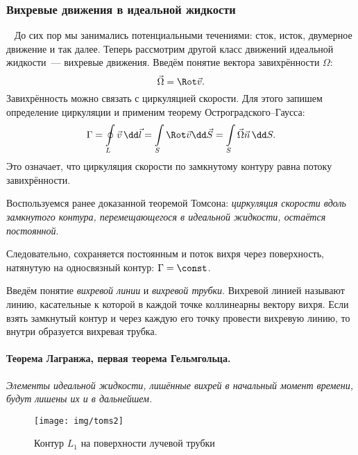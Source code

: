 %


\subsubsection{Вихревые движения в идеальной жидкости}\
До сих пор мы занимались потенциальными течениями: сток, исток, двумерное движение и так далее. Теперь рассмотрим другой класс движений идеальной жидкости~--- вихревые движения.
%
Введём понятие вектора завихрённости $\Omega$:
\begin{equation}
	\vec\Omega=\Rot \vec{v}.
\end{equation}
Завихрённость можно связать с циркуляцией скорости. Для этого запишем определение циркуляции и применим теорему Остроградского--Гаусса:
\begin{equation}
	\Gamma=\oint\limits_L \vec{v} \,\dd\vec{l}
	=\int\limits_S \Rot \vec{v}\dd \vec{S}=\int\limits_S \vec\Omega\vec{n}\,\dd S.
\end{equation}
Это означает, что циркуляция скорости по замкнутому контуру равна потоку завихрённости.

Воспользуемся ранее доказанной теоремой Томсона: \textit{циркуляция скорости вдоль замкнутого контура,
перемещающегося в идеальной жидкости, остаётся постоянной}.

Следовательно, сохраняется постоянным и поток вихря через
поверхность, натянутую на односвязный контур: $\Gamma=\const$.

Введём понятие \textit{вихревой линии} и \textit{вихревой трубки}.
Вихревой линией называют линию, касательные к которой в каждой
точке коллинеарны вектору вихря.
Если взять замкнутый контур и через каждую его точку провести
вихревую линию, то внутри образуется вихревая трубка.




\paragraph{Теорема Лагранжа, первая теорема Гельмгольца. } \textit{Элементы идеальной жидкости, лишённые вихрей в начальный момент времени, будут лишены их и в дальнейшем.}
    \begin{figure}[H]
        \centering
        \texttt{[image: img/toms2]}
        \caption{Контур $L_1$ на поверхности лучевой трубки}
        \label{fig:toms2}
    \end{figure}

